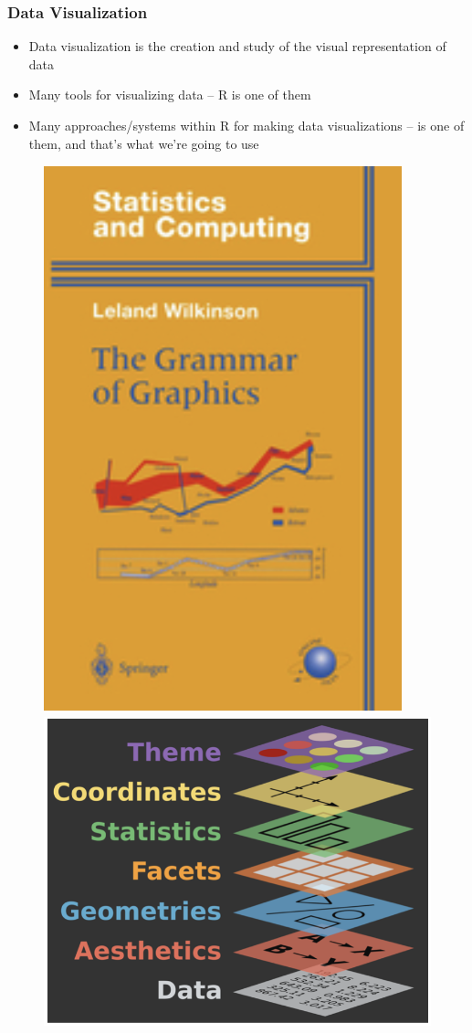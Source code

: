 \documentclass[11pt]{beamer}
\begin{document}
			\begin{frame}
		
		\frametitle{\textbf{Data Visualization}}

			\begin{minipage}[t]{0.5\linewidth}
			\vspace{-1em}
				\begin{itemize}
				\item Data visualization is the creation and study of the visual representation of data
				\item Many tools for visualizing data -- R is one of them
				\item Many approaches/systems within R for making data visualizations --  is one of them, and that's what we're going to use
			\end{itemize}
		\end{minipage}%
		\begin{minipage}[t]{0.5\linewidth}
			\vspace{-3em}
			\begin{figure}
				\centering
				\includegraphics[width=0.35\linewidth]{Images/S2/grammar-of-graphics1}
				\includegraphics[width=0.7\linewidth]{Images/S2/grammar-of-graphics2}
		
			\end{figure}
	 
			
		\end{minipage}
	\end{frame}
\end{document}
